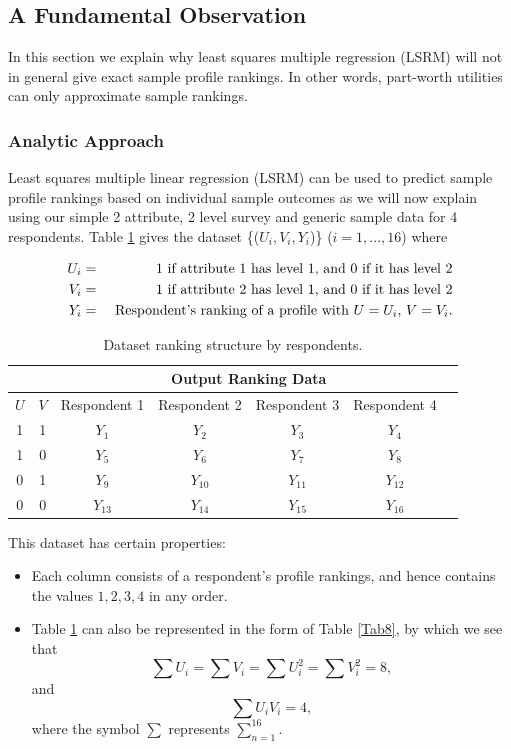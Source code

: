 \documentclass[a4paper, 12pt]{article}
\begin{document}
\subsection{A Fundamental Observation}
In this section we explain why  least squares multiple  regression (LSRM) will not in general give exact sample profile rankings. In other words, part-worth utilities can only approximate sample rankings.


\subsubsection{Analytic Approach}

Least squares multiple linear regression (LSRM) can be used to predict sample profile rankings based on individual sample outcomes as we will now explain using our simple 2 attribute, 2 level survey and generic sample data for 4 respondents. Table \ref{Tab7} gives the dataset \{($U_i,V_i,Y_i$)\} ($i = 1,...,16$) where

\begin{eqnarray*}
	U_i&=& 1 \textup{ if attribute 1 has level 1, and 0 if it has level 2}\\
	V_i&=& 1 \textup{ if attribute 2 has level 1, and 0 if it has level 2}\\
	Y_i&=& \textup{ Respondent's ranking of a profile with $U=U_i$, $V=V_i$.}
\end{eqnarray*}

\begin{table}[!htpb]
	\centering
	\small
	\begin{tabular}{cc|ccccc}
		\multicolumn{2}{c}{} &\multicolumn{4}{c}{Output Ranking Data}\\\hline
		$U$ & $V$ & Respondent 1&  Respondent 2& Respondent 3& Respondent 4\\  \hline
		1 &1&$Y_1$&$Y_2$&$Y_3$&$Y_4$\\
		1 &0&$Y_5$&$Y_6$&$Y_7$&$Y_8$ \\
		0 &1&$Y_9$&$Y_{10}$&$Y_{11}$&$Y_{12}$ \\
		0 &0&$Y_{13}$&$Y_{14}$&$Y_{15}$&$Y_{16}$ \\\hline
	\end{tabular}
	\caption{{\small Dataset ranking structure by respondents.}}
	\label{Tab7}
\end{table}


This dataset has certain properties:
\begin{itemize}
	\item
	Each column consists of a respondent's profile rankings, and hence contains the values $1, 2, 3, 4$ in any order.
	
	\item
	Table \ref{Tab7} can also be represented in the form of Table \ref{Tab8}, by which we see that $$\sum U_i = \sum V_i = \sum U_i^2 = \sum V_i^2= 8, $$ and $$ \sum U_iV_i = 4,$$ where the symbol $\sum $ represents $\displaystyle \sum_{n=1}^{16}$.
\end{itemize}
\end{document}
